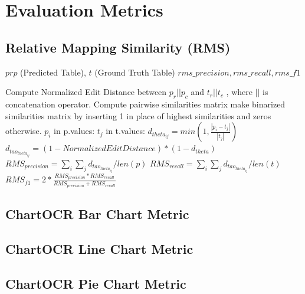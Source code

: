 \documentclass[
	letterpaper, %
]{jdf}
\begin{document}
\appendix
\section{Evaluation Metrics}\label{app:metrics}
\subsection{Relative Mapping Similarity (RMS)}\label{app:rms-algorithm}
\begin{algorithm}
    \begin{algorithmic}[1]
 \Require $prp$ (Predicted Table), $t$ (Ground Truth Table)
        \Ensure $rms\_precision, rms\_recall, rms\_f1$

        Compute Normalized Edit Distance between $p_r || p_c$ and $t_r || t_c$
    , where $||$ is concatenation operator.
        Compute pairwise similarities matrix
        make binarized similarities matrix by inserting 1 in place of highest similarities and zeros otherwise.
        \For $p_i$ in p.values:
        \For $t_j$ in t.values:
        $d_{theta_{ij}} = min(1, \frac{|p_i - t_j|}{|t_j|})$
        $d_{tao_{theta_{ij}}} = (1-Normalized Edit Distance) * (1-d_{theta})$
        \EndFor
        \EndFor
        $RMS_{precision} = \sum_{i} \sum_j d_{tao_{theta_{ij}}} / len(p)$
        $RMS_{recall} = \sum_{i} \sum_j d_{tao_{theta_{ij}}} / len(t)$
        $RMS_{f1} = 2 * \frac{RMS_{precision} * RMS_{recall}}{RMS_{precision} + RMS_{recall}}$
    \end{algorithmic}
\end{algorithm}
\subsection{ChartOCR Bar Chart Metric}
\subsection{ChartOCR Line Chart Metric}
\subsection{ChartOCR Pie Chart Metric}
\end{document}
